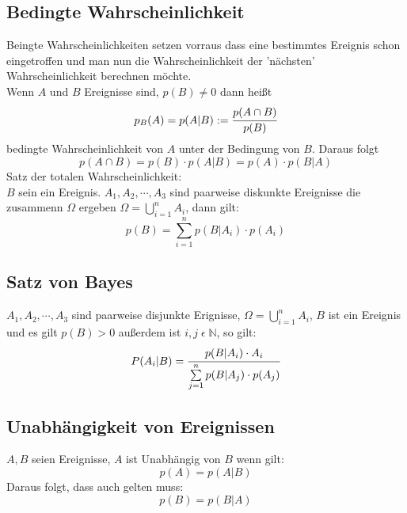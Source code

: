 \documentclass[a4paper]{scrartcl}
\begin{document}
        \subsection{Bedingte Wahrscheinlichkeit}
            Beingte Wahrscheinlichkeiten setzen vorraus dass eine bestimmtes Ereignis schon eingetroffen und man nun die Wahrscheinlichkeit der 'nächsten' Wahrscheinlichkeit berechnen möchte. \\
            Wenn \(A\) und \(B\) Ereignisse sind, \(p(B) \neq 0\) dann heißt 
            \begin{equation*}
                p_B(A) = p(A|B) := \cfrac{p (A \cap B)}{p(B)}
            \end{equation*} 
            bedingte Wahrscheinlichkeit von \(A\) unter der Bedingung von \(B\). Daraus folgt 
            \begin{equation*}
                p(A \cap B) = p(B) \cdot p(A|B) = p(A) \cdot p(B|A) 
            \end{equation*}
            Satz der totalen Wahrscheinlichkeit:\\
            \(B\) sein ein Ereignis. \(A_1,A_2,\cdots,A_3\) sind paarweise diskunkte Ereignisse die zusammenn \(\Omega\) ergeben \(\Omega = \bigcup\limits_{i=1}^n A_i \), dann gilt: 
            \begin{equation*}
                p(B) = \sum\limits_{i=1}^n p(B|A_i) \cdot p(A_i)
            \end{equation*}
        \subsection{Satz von Bayes}
            \(A_1,A_2,\cdots,A_3\) sind paarweise disjunkte Erignisse, \(\Omega = \bigcup\limits_{i=1}^n A_i\), \(B\) ist ein Ereignis und es gilt \(p(B) > 0\) außerdem ist \(i,j \; \epsilon \; \mathbb{N}\), so gilt:
            \begin{equation*}
                P(A_i|B) = \cfrac{p(B|A_i) \cdot A_i}{\sum\limits_{j=1}^n p(B|A_j) \cdot p(A_j)} %
            \end{equation*}
        \subsection{Unabhängigkeit von Ereignissen}
            \(A, B\) seien Ereignisse, \(A\) ist Unabhängig von \(B\) wenn gilt:
            \begin{equation*}
                p(A) = p(A|B)
            \end{equation*}
            Daraus folgt, dass auch gelten muss: 
            \begin{equation*}
                p(B) = p(B|A)
            \end{equation*}
\end{document}
